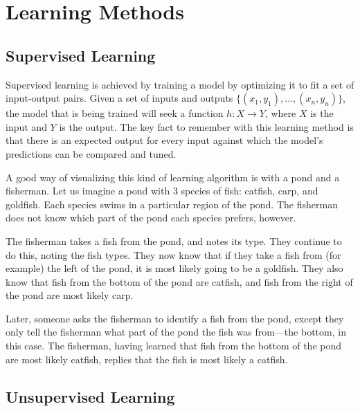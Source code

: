 \documentclass{comjnl}
\numberwithin{equation}{subsection}
\begin{document}

    \section{Learning Methods}\label{sec:learn}

        \subsection{Supervised Learning}\label{sec:sup}

            Supervised learning is achieved by training a model by optimizing it to fit a set of
            input-output pairs. Given a set of inputs and outputs $\{(x_1,y_1),...,(x_n,y_n)\}$,
            the model that is being trained will seek a function $h : X \to Y$, where $X$ is the
            input and $Y$ is the output. The key fact to remember with this learning method is that
            there is an expected output for every input against which the model's predictions can be
            compared and tuned.

            A good way of visualizing this kind of learning algorithm is with a pond and a fisherman.
            Let us imagine a pond with 3 species of fish: catfish, carp, and goldfish. Each species
            swims in a particular region of the pond. The fisherman does not know which part of the
            pond each species prefers, however.

            The fisherman takes a fish from the pond, and notes its type. They continue to do this,
            noting the fish types. They now know that if they take a fish from (for example) the
            left of the pond, it is most likely going to be a goldfish. They also know that fish
            from the bottom of the pond are catfish, and fish from the right of the pond are most
            likely carp.

            Later, someone asks the fisherman to identify a fish from the pond, except they only
            tell the fisherman what part of the pond the fish was from---the bottom, in this case.
            The fisherman, having learned that fish from the bottom of the pond are most likely
            catfish, replies that the fish is most likely a catfish.

        \subsection{Unsupervised Learning}\label{sec:unsup}
\end{document}
